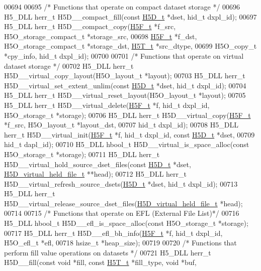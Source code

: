 \begin{DoxyCode}
00694 
00695 \textcolor{comment}{/* Functions that operate on compact dataset storage */}
00696 H5\_DLL herr\_t H5D\_\_compact\_fill(\textcolor{keyword}{const} \hyperlink{struct_h5_d__t}{H5D\_t} *dset, hid\_t dxpl\_id);
00697 H5\_DLL herr\_t H5D\_\_compact\_copy(\hyperlink{struct_h5_f__t}{H5F\_t} *f\_src, H5O\_storage\_compact\_t *storage\_src,
00698     \hyperlink{struct_h5_f__t}{H5F\_t} *f\_dst, H5O\_storage\_compact\_t *storage\_dst, \hyperlink{struct_h5_t__t}{H5T\_t} *src\_dtype,
00699     H5O\_copy\_t *cpy\_info, hid\_t dxpl\_id);
00700 
00701 \textcolor{comment}{/* Functions that operate on virtual dataset storage */}
00702 H5\_DLL herr\_t H5D\_\_virtual\_copy\_layout(H5O\_layout\_t *layout);
00703 H5\_DLL herr\_t H5D\_\_virtual\_set\_extent\_unlim(\textcolor{keyword}{const} \hyperlink{struct_h5_d__t}{H5D\_t} *dset, hid\_t dxpl\_id);
00704 H5\_DLL herr\_t H5D\_\_virtual\_reset\_layout(H5O\_layout\_t *layout);
00705 H5\_DLL herr\_t H5D\_\_virtual\_delete(\hyperlink{struct_h5_f__t}{H5F\_t} *f, hid\_t dxpl\_id, H5O\_storage\_t *storage);
00706 H5\_DLL herr\_t H5D\_\_virtual\_copy(\hyperlink{struct_h5_f__t}{H5F\_t} *f\_src, H5O\_layout\_t *layout\_dst,
00707     hid\_t dxpl\_id);
00708 H5\_DLL herr\_t H5D\_\_virtual\_init(\hyperlink{struct_h5_f__t}{H5F\_t} *f, hid\_t dxpl\_id, \textcolor{keyword}{const} \hyperlink{struct_h5_d__t}{H5D\_t} *dset,
00709     hid\_t dapl\_id);
00710 H5\_DLL hbool\_t H5D\_\_virtual\_is\_space\_alloc(\textcolor{keyword}{const} H5O\_storage\_t *storage);
00711 H5\_DLL herr\_t H5D\_\_virtual\_hold\_source\_dset\_files(\textcolor{keyword}{const} \hyperlink{struct_h5_d__t}{H5D\_t} *dset, 
      \hyperlink{struct_h5_d__virtual__held__file__t}{H5D\_virtual\_held\_file\_t} **head);
00712 H5\_DLL herr\_t H5D\_\_virtual\_refresh\_source\_dsets(\hyperlink{struct_h5_d__t}{H5D\_t} *dset, hid\_t dxpl\_id);
00713 H5\_DLL herr\_t H5D\_\_virtual\_release\_source\_dset\_files(\hyperlink{struct_h5_d__virtual__held__file__t}{H5D\_virtual\_held\_file\_t} *head);
00714 
00715 \textcolor{comment}{/* Functions that operate on EFL (External File List)*/}
00716 H5\_DLL hbool\_t H5D\_\_efl\_is\_space\_alloc(\textcolor{keyword}{const} H5O\_storage\_t *storage);
00717 H5\_DLL herr\_t H5D\_\_efl\_bh\_info(\hyperlink{struct_h5_f__t}{H5F\_t} *f, hid\_t dxpl\_id, H5O\_efl\_t *efl,
00718     hsize\_t *heap\_size);
00719 
00720 \textcolor{comment}{/* Functions that perform fill value operations on datasets */}
00721 H5\_DLL herr\_t H5D\_\_fill(\textcolor{keyword}{const} \textcolor{keywordtype}{void} *fill, \textcolor{keyword}{const} \hyperlink{struct_h5_t__t}{H5T\_t} *fill\_type, \textcolor{keywordtype}{void} *buf,

\end{DoxyCode}
